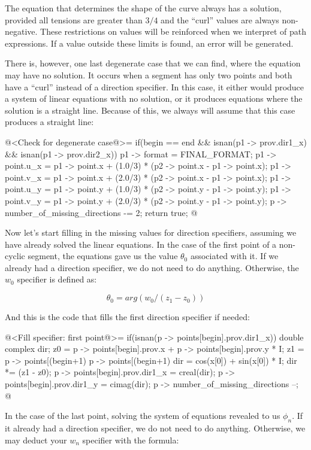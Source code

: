 The equation that determines the shape of the curve always has a
solution, provided all tensions are greater than $3/4$ and the
​​``curl'' values are always non-negative. These restrictions on values
​​will be reinforced when we interpret of path expressions. If a value
outside these limits is found, an error will be generated.

There is, however, one last degenerate case that we can find, where
the equation may have no solution. It occurs when a segment has only
two points and both have a ``curl'' instead of a direction
specifier. In this case, it either would produce a system of linear
equations with no solution, or it produces equations where the
solution is a straight line. Because of this, we always will assume
that this case produces a straight line:

\iniciocodigo
@<Check for degenerate case@>=
if(begin == end && isnan(p1 -> prov.dir1_x) && isnan(p1 -> prov.dir2_x)){
  p1 -> format = FINAL_FORMAT;
  p1 -> point.u_x = p1 -> point.x + (1.0/3) * (p2 -> point.x - p1 -> point.x);
  p1 -> point.v_x = p1 -> point.x + (2.0/3) * (p2 -> point.x - p1 -> point.x);
  p1 -> point.u_y = p1 -> point.y + (1.0/3) * (p2 -> point.y - p1 -> point.y);
  p1 -> point.v_y = p1 -> point.y + (2.0/3) * (p2 -> point.y - p1 -> point.y);
  p -> number_of_missing_directions -= 2;
  return true;
}
@
\fimcodigo

Now let's start filling in the missing values ​​for direction
specifiers, assuming we have already solved the linear equations. In
the case of the first point of a non-cyclic segment, the equations
gave us the value $\theta_0$ associated with it. If we already had a
direction specifier, we do not need to do anything. Otherwise, the
$w_0$ specifier is defined as:

$$
\theta_0 = arg(w_0/(z_1-z_0))
$$

And this is the code that fills the first direction specifier if
needed:

\iniciocodigo
@<Fill specifier: first point@>=
if(isnan(p -> points[begin].prov.dir1_x)){
  double complex dir;
  z0 = p -> points[begin].prov.x + p -> points[begin].prov.y * I;
  z1 = p -> points[(begin+1) %
       p -> points[(begin+1) %
  dir = cos(x[0]) + sin(x[0]) * I;
  dir *= (z1 - z0);
  p -> points[begin].prov.dir1_x = creal(dir);
  p -> points[begin].prov.dir1_y = cimag(dir);
  p -> number_of_missing_directions --;
}
@
\fimcodigo

In the case of the last point, solving the system of equations
revealed to us $\phi_{n}$. If it already had a direction specifier, we
do not need to do anything. Otherwise, we may deduct your $w_n$
specifier with the formula:

